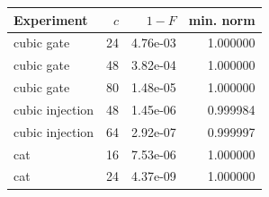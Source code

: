 \begin{tabular}{lrrr}
\toprule
Experiment & $c$ & $1-F$ & min. norm \\
\midrule
cubic gate & 24 & 4.76e-03 & 1.000000 \\
cubic gate & 48 & 3.82e-04 & 1.000000 \\
cubic gate & 80 & 1.48e-05 & 1.000000 \\
cubic injection & 48 & 1.45e-06 & 0.999984 \\
cubic injection & 64 & 2.92e-07 & 0.999997 \\
cat & 16 & 7.53e-06 & 1.000000 \\
cat & 24 & 4.37e-09 & 1.000000 \\
\bottomrule
\end{tabular}